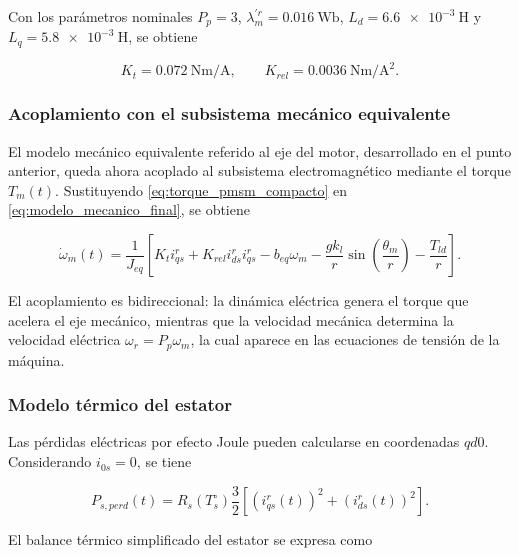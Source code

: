 \documentclass[10pt,a4paper]{article}
\begin{document}
Con los parámetros nominales \(P_p=3\), \(\lambda_m^{\prime r}=\SI{0.016}{\weber}\), \(L_d=\SI{6.6e-3}{\henry}\) y \(L_q=\SI{5.8e-3}{\henry}\), se obtiene

\begin{equation}
    K_t=\SI{0.072}{\newton\meter\per\ampere},
    \qquad
    K_{rel}=\SI{0.0036}{\newton\meter\per\ampere\squared}.
    \label{eq:kt_krel_numerico}
\end{equation}

\subsubsection{Acoplamiento con el subsistema mecánico equivalente}

El modelo mecánico equivalente referido al eje del motor, desarrollado en el punto anterior, queda ahora acoplado al subsistema electromagnético mediante el torque \(T_m(t)\). Sustituyendo \eqref{eq:torque_pmsm_compacto} en \eqref{eq:modelo_mecanico_final}, se obtiene

\begin{equation}
    \dot{\omega}_m(t)
    =
    \frac{1}{J_{eq}}
    \left[
    K_t i_{qs}^{r}
    +
    K_{rel}i_{ds}^{r}i_{qs}^{r}
    -
    b_{eq}\omega_m
    -
    \frac{gk_l}{r}\sin\left(\frac{\theta_m}{r}\right)
    -
    \frac{T_{ld}}{r}
    \right].
    \label{eq:omega_dot_acoplada}
\end{equation}

El acoplamiento es bidireccional: la dinámica eléctrica genera el torque que acelera el eje mecánico, mientras que la velocidad mecánica determina la velocidad eléctrica \(\omega_r=P_p\omega_m\), la cual aparece en las ecuaciones de tensión de la máquina.

\subsubsection{Modelo térmico del estator}

Las pérdidas eléctricas por efecto Joule pueden calcularse en coordenadas \(qd0\). Considerando \(i_{0s}=0\), se tiene

\begin{equation}
    P_{s,perd}(t)
    =
    R_s\left(T_s^{\circ}\right)
    \frac{3}{2}
    \left[
    \left(i_{qs}^{r}(t)\right)^2+
    \left(i_{ds}^{r}(t)\right)^2
    \right].
    \label{eq:perdidas_joule_qd}
\end{equation}

El balance térmico simplificado del estator se expresa como
\end{document}

